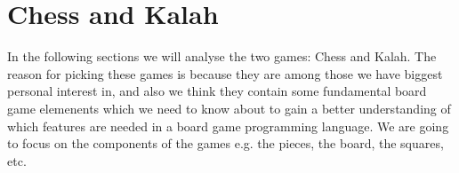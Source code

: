 \section{Chess and Kalah}
\label{sec:chessandkalah}

In the following sections we will analyse the two games: Chess and Kalah. The reason for picking these games is because they are among those we have biggest personal interest in, and also we think they contain some fundamental board game elemenents which we need to know about to gain a better understanding of which features are needed in a board game programming language. We are going to focus on the components of the games e.g. the pieces, the board, the squares, etc.


  

